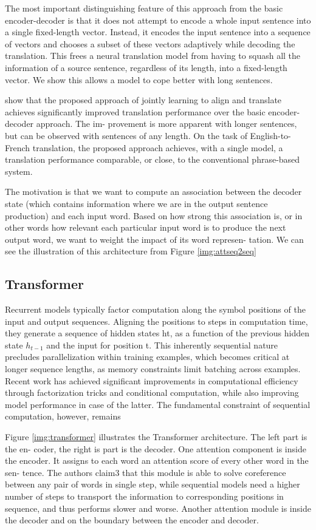 The most important distinguishing feature of this approach from the basic encoder-decoder is that
it does not attempt to encode a whole input sentence into a single fixed-length vector. Instead, it encodes the input sentence into a sequence of vectors and chooses a subset of these vectors adaptively
while decoding the translation. This frees a neural translation model from having to squash all the
information of a source sentence, regardless of its length, into a fixed-length vector. We show this
allows a model to cope better with long sentences.

show that the proposed approach of jointly learning to align and translate achieves
significantly improved translation performance over the basic encoder-decoder approach. The im-
provement is more apparent with longer sentences, but can be observed with sentences of any
length. On the task of English-to-French translation, the proposed approach achieves, with a single
model, a translation performance comparable, or close, to the conventional phrase-based system.

The motivation is that we want to compute an association between the decoder state (which
contains information where we are in the output sentence production) and each input word.
Based on how strong this association is, or in other words how relevant each particular input
word is to produce the next output word, we want to weight the impact of its word represen-
tation. We can see the illustration of this architecture from Figure \ref{img:attseq2seq}

\subsection{Transformer}
Recurrent models typically factor computation along the symbol positions of the input and output
sequences. Aligning the positions to steps in computation time, they generate a sequence of hidden
states ht, as a function of the previous hidden state $h_{t-1}$ and the input for position t. This inherently
sequential nature precludes parallelization within training examples, which becomes critical at longer
sequence lengths, as memory constraints limit batching across examples. Recent work has achieved
significant improvements in computational efficiency through factorization tricks and conditional
computation, while also improving model performance in case of the latter. The fundamental
constraint of sequential computation, however, remains

Figure \ref{img:transformer} illustrates the Transformer architecture. The left part is the en- coder, the right is part is the decoder. One attention component is inside the encoder. It assigns to each word an attention score of every other word in the sen- tence. The authors claim3 that this module is able to solve coreference between any pair of words in single step, while sequential models need a higher number of steps to transport the information to corresponding positions in sequence, and thus performs slower and worse. Another attention module is inside the decoder and on the boundary between the encoder and decoder.

